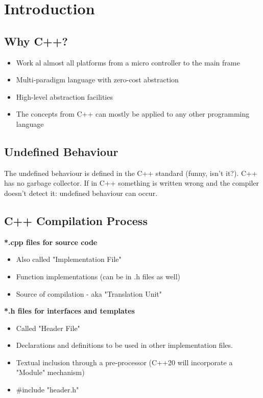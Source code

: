 \section{Introduction}
\subsection{Why C++?}
\begin{itemize}
  \itemsep0em 
  \item Work al almost all platforms from a micro controller to the main frame
  \item Multi-paradigm language with zero-cost abstraction
  \item High-level abstraction facilities
  \item The concepts from C++ can mostly be applied to any other programming language
\end{itemize}

\subsection{Undefined Behaviour}
The undefined behaviour is defined in the C++ standard (funny, isn't it?). C++ has no garbage collector. If in C++ something is written wrong and the compiler doesn't detect it: undefined behaviour can occur.

\subsection{C++ Compilation Process}
\textbf{*.cpp files for source code}
\begin{itemize}
  \itemsep0em 
  \item Also called "Implementation File"
  \item Function implementations (can be in .h files as well)
  \item Source of compilation - aka "Translation Unit"
\end{itemize}
\textbf{*.h files for interfaces and templates}
\begin{itemize}
  \item Called "Header File"
  \item Declarations and definitions to be used in other implementation files.
  \item Textual inclusion through a pre-processor (C++20 will incorporate a "Module" mechanism)
  \item \#include "header.h"
\end{itemize}


